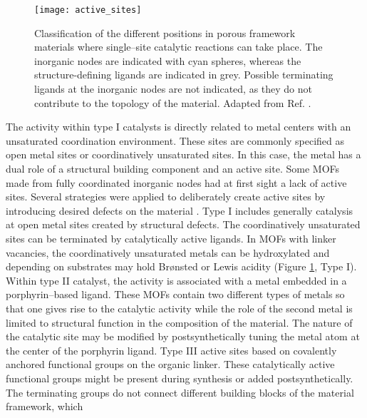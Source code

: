 \begin{figure}[!h]
	\centering
	\texttt{[image: active\_sites]}
	\caption[Classification of the different positions in porous framework
	materials where single--site catalytic reactions can take place. The inorganic
	nodes are indicated with cyan spheres, whereas the structure-defining ligands
	are indicated in grey. Possible terminating ligands at the inorganic nodes are not indicated, as they do not contribute to the topology of the material.]{Classification of the different positions in porous framework
	materials where single--site catalytic reactions can take place. The inorganic
	nodes are indicated with cyan spheres, whereas the structure-defining ligands
	are indicated in grey. Possible terminating ligands at the inorganic nodes are not indicated, as they do not contribute to the topology of the material. Adapted
from Ref. \cite{Rogge2017}.}
	\label{fig:active_sites}
\end{figure}
\npar
\newpage
The activity within type I catalysts is directly related to metal centers with
an unsaturated coordination environment. These sites are commonly specified as
open metal sites or coordinatively unsaturated sites. In this case, the metal
has a dual role of a structural building component and an active site. Some MOFs
made from fully coordinated inorganic nodes had at first sight a lack of active
sites. Several strategies were applied to deliberately create active sites
by introducing desired defects on the material \cite{Fang2015}. Type I includes
generally catalysis at open metal sites created by structural defects. The coordinatively unsaturated sites can be terminated by catalytically active ligands. In MOFs with linker vacancies, the coordinatively unsaturated
metals can be hydroxylated and depending on substrates may hold Br\o{}nsted or
Lewis acidity (Figure \ref{fig:active_sites}, Type I).
Within type II catalyst, the activity is associated with a metal
embedded in a porphyrin--based ligand. These MOFs contain two different types of
metals so that one gives rise to the catalytic activity while the role of the
second metal is limited to structural function in the composition of the material.
The nature of the catalytic site may be modified by postsynthetically tuning
the metal atom at the center of the porphyrin ligand.
Type III active sites based on covalently anchored functional groups on the
organic linker. These catalytically active functional groups might be present
during synthesis or added postsynthetically. The terminating groups
do not connect different building blocks of the material framework, which 
